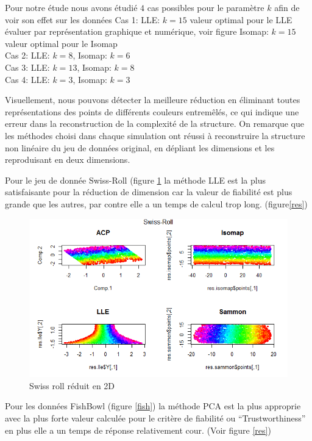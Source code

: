 \documentclass[twoside,twocolumn]{article}
\begin{document}
Pour notre étude nous  avons étudié $4$ cas possibles pour le paramètre $k$ afin de voir son effet sur les données
Cas 1: 
LLE: $k=15$ valeur optimal pour le LLE évaluer par représentation graphique et numérique, voir figure 
Isomap: $k=15$ valeur optimal pour le Isomap  \\
Cas 2: 
LLE: $k=8$,   Isomap: $k=6$\\
Cas 3: 
LLE: $k=13$, Isomap: $k=8$\\
Cas 4:
LLE: $k=3$,   Isomap: $k=3$

Visuellement, nous pouvons détecter la meilleure réduction en éliminant toutes représentations des points de différents couleurs entremêlés, ce qui indique une erreur dans la reconstruction de la complexité de la structure. On remarque que les méthodes choisi dans chaque simulation ont réussi à reconstruire la structure non linéaire du jeu de données original, en dépliant les dimensions et les reproduisant en deux dimensions.

Pour le jeu de donnée  Swiss-Roll (figure \ref{swiss}  la méthode LLE est la plus satisfaisante pour la réduction de dimension car la valeur de fiabilité est plus grande que les autres, par contre elle a un temps de calcul trop long. (figure\ref{res})

\begin{figure}[ht!]
 \centering
\includegraphics[width=\linewidth]{sreduit.png}
\vspace{-20pt}
 \caption{Swiss roll réduit en 2D}
 \label{swiss}
\end{figure}

Pour les données FishBowl (figure \ref{fish}) la méthode  PCA est la plus approprie avec la plus forte valeur calculée pour le critère de fiabilité ou “Trustworthiness” en plus elle a un temps de réponse relativement cour. (Voir figure \ref{res})
\end{document}
